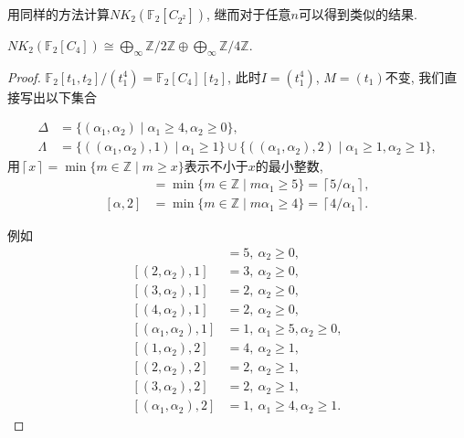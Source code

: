 用同样的方法计算$NK_2(\mathbb{F}_2[C_{2^2}])$, 继而对于任意$n$可以得到类似的结果. 

\begin{theorem}
	$NK_2(\mathbb{F}_2[C_4])\cong \bigoplus_{\infty} \mathbb{Z}/2 \mathbb{Z}\oplus \bigoplus_{\infty}\mathbb{Z}/4 \mathbb{Z}$. 
\end{theorem}
\begin{proof}
	$\mathbb{F}_2[t_1, t_2]/(t_1^4)=\mathbb{F}_2[C_{4}][t_2]$, 此时$I=(t_1^4)$, $M=(t_1)$不变, 我们直接写出以下集合

\begin{align*}
\Delta &=\{(\alpha_1, \alpha_2)\mid \alpha_1\geq 4, \alpha_2 \geq 0\}, \\
\Lambda &=\{((\alpha_1, \alpha_2), 1) \mid \alpha_1\geq 1\}\cup \{((\alpha_1, \alpha_2), 2) \mid \alpha_1\geq 1, \alpha_2\geq 1\}, 
\end{align*}
用$\left \lceil x \right \rceil=\min \{m\in \mathbb{Z}\mid m\geq x\}$表示不小于$x$的最小整数, 
\begin{align*}
[\alpha, 1] & =\min \{m\in \mathbb{Z} \mid m \alpha_1\geq 5\}=\left \lceil 5/\alpha_1 \right \rceil, \\
[\alpha, 2] & =\min \{m\in \mathbb{Z} \mid m \alpha_1\geq 4\}=\left \lceil 4/\alpha_1 \right \rceil. 
\end{align*}

例如
\begin{align*}
[(1, \alpha_2), 1] & = 5, \ \alpha_2\geq 0, \\
[(2, \alpha_2), 1] & = 3, \ \alpha_2\geq 0, \\
[(3, \alpha_2), 1] & = 2, \ \alpha_2\geq 0, \\
[(4, \alpha_2), 1] & = 2, \ \alpha_2\geq 0, \\
[(\alpha_1, \alpha_2), 1] & = 1, \ \alpha_1\geq 5, \alpha_2\geq 0, \\
[(1, \alpha_2), 2] & = 4, \ \alpha_2\geq 1, \\
[(2, \alpha_2), 2] & = 2, \ \alpha_2\geq 1, \\
[(3, \alpha_2), 2] & = 2, \ \alpha_2\geq 1, \\
[(\alpha_1, \alpha_2), 2] & = 1, \ \alpha_1\geq 4, \alpha_2\geq 1. 
\end{align*}



\end{proof}
